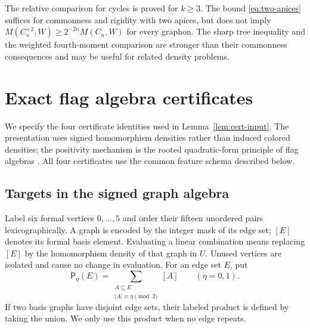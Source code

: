 \documentclass[11pt,a4paper]{article}
\theoremstyle{remark}
\numberwithin{equation}{section}
\begin{document}
The relative comparison for cycles is proved for $k\geq3$.
The bound \eqref{eq:two-apices} suffices for commonness and
rigidity with two apices, but does not imply
$M(C_n^{+2},W)\geq2^{-2n}M(C_n,W)$ for every graphon.
The sharp tree inequality and the weighted
fourth-moment comparison are stronger than their commonness
consequences and may be useful for related density problems.

\appendix
\section{Exact flag algebra certificates}\label{app:certificates}

We specify the four certificate identities used in
Lemma~\ref{lem:cert-input}. The presentation uses signed
homomorphism densities rather than induced colored densities;
the positivity mechanism is the rooted quadratic-form principle
of flag algebras \cite{Razborov}. All four certificates use the
common feature schema described below.

\subsection{Targets in the signed graph algebra}

Label six formal vertices $0,\ldots,5$ and order their fifteen
unordered pairs lexicographically. A graph is encoded by the
integer mask of its edge set; $[E]$ denotes its formal basis
element. Evaluating a linear combination means replacing
$[E]$ by the homomorphism density of that graph in $U$.
Unused vertices are isolated and cause no change in evaluation.
For an edge set $E$, put
\[
 \mathsf P_\eta(E)=
 \sum_{\substack{A\subseteq E\\|A|\equiv\eta\pmod2}}[A]
 \qquad(\eta=0,1).
\]
If two basis graphs have disjoint edge sets, their labeled product
is defined by taking the union. We only use this product when no
edge repeats.
\end{document}
